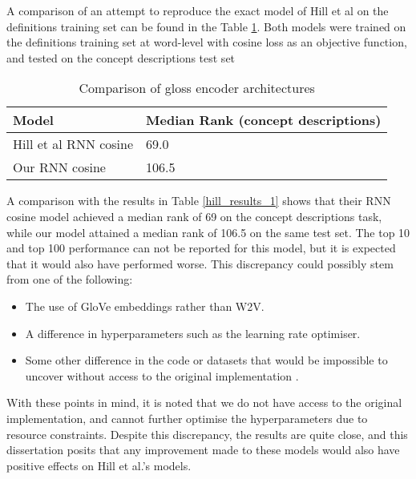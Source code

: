 \documentclass[11pt]{article}
\begin{document}
\begin{spacing}{1}
A comparison of an attempt to reproduce the exact model of Hill et al \citeyear{hill2015learning} on the definitions training set can be found in the Table \ref{hill_jp_comparison}. Both models were trained on the definitions training set at word-level with cosine loss as an objective function, and tested on the concept descriptions test set

\begin{table}[!htpb]
\caption{Comparison of gloss encoder architectures}
\centering
\begin{tabular}{ll}
\toprule
Model     & Median Rank (concept descriptions) \\\midrule
Hill et al RNN cosine    & 69.0             \\
Our RNN cosine       & 106.5               \\
\end{tabular}
\label{hill_jp_comparison}
\end{table}

A comparison with the results in Table \ref{hill_results_1} shows that their RNN cosine model achieved a median rank of 69 on the concept descriptions task, while our model attained a median rank of 106.5 on the same test set. The top 10 and top 100 performance can not be reported for this model, but it is expected that it would also have performed worse. This discrepancy could possibly stem from one of the following:
\begin{itemize}
\item The use of GloVe embeddings rather than W2V.
\item A difference in hyperparameters such as the learning rate optimiser.
\item Some other difference in the code or datasets that would be impossible to uncover without access to the original implementation .
\end{itemize}

With these points in mind, it is noted that we do not have access to the original implementation, and cannot further optimise the hyperparameters due to resource constraints. Despite this discrepancy, the results are quite close, and this dissertation posits that any improvement made to these models would also have positive effects on Hill et al.'s models.


\end{spacing}
\end{document}
